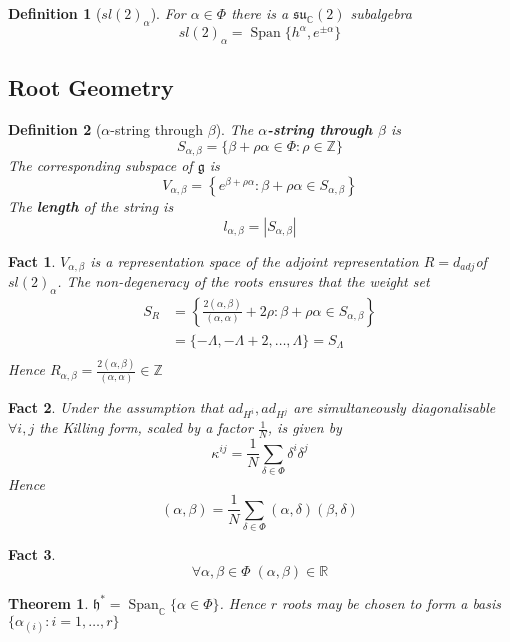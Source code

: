 \documentclass{article}
\newtheorem{theorem}{Theorem}[subsection]
\newtheorem{definition}{Definition}[subsection]
\newtheorem{fact}{Fact}[subsection]
\DeclareMathOperator{\spn}{Span}
\newcommand{\bam}[1]{\textbf{#1}}
\newcommand{\mf}[1]{\mathfrak{#1}}
\newcommand{\mbb}[1]{\mathbb{#1}}
\begin{document}
\begin{definition}[$sl(2)_\alpha$]
For $\alpha\in\Phi$ there is a $\mf{su}_\mbb{C}(2)$ subalgebra 
\[
sl(2)_\alpha=\spn\lbrace h^\alpha, e^{\pm\alpha}\rbrace
\]
\end{definition}


\subsection{Root Geometry}

\begin{definition}[$\alpha$-string through $\beta$]
The \bam{$\alpha$-string through $\beta$} is 
\[
S_{\alpha, \beta}=\lbrace \beta+\rho\alpha\in\Phi : \rho\in\mbb{Z} \rbrace
\]
The corresponding subspace of $\mf{g}$ is 
\[
V_{\alpha, \beta}=\left\{ e^{\beta+\rho\alpha} : \beta+\rho\alpha\in S_{\alpha, \beta} \right\}
\]
The \bam{length} of the string is 
\[
l_{\alpha,\beta}=|S_{\alpha,\beta}|
\]
\end{definition}
\begin{fact}
$V_{\alpha, \beta}$ is a representation space of the adjoint representation $R=d_{adj}$of $sl(2)_\alpha$. The non-degeneracy of the roots ensures that the weight set 
\begin{align*}
    S_R &= \left\{ \frac{2(\alpha,\beta)}{(\alpha,\alpha)}+2\rho : \beta+\rho\alpha\in S_{\alpha, \beta} \right\} \\
     &= \lbrace -\Lambda,-\Lambda+2,\dots,\Lambda\rbrace=S_\Lambda \\
\end{align*}
Hence $R_{\alpha,\beta}=\frac{2(\alpha,\beta)}{(\alpha,\alpha)} \in\mbb{Z}$
\end{fact}

\begin{fact}
Under the assumption that $ad_{H^i}, ad_{H^j}$ are simultaneously diagonalisable $\forall i,j$ the Killing form, scaled by a factor $\frac{1}{N}$, is given by 
\[
\kappa^{ij}=\frac{1}{N} \sum_{\delta\in\Phi} \delta^i\delta^j
\]
Hence 
\[
(\alpha, \beta)= \frac{1}{N}\sum_{\delta\in\Phi} (\alpha, \delta) (\beta, \delta)
\]
\end{fact}

\begin{fact}
\[
\forall \alpha, \beta\in\Phi \; (\alpha, \beta)\in\mbb{R}
\]
\end{fact}

\begin{theorem}
$\mf{h}^\ast=\spn_\mbb{C}\lbrace \alpha\in\Phi \rbrace$. Hence $r$ roots may be chosen to form a basis $\lbrace \alpha_{(i)} : i=1,\dots,r \rbrace$
\end{theorem}
\end{document}
